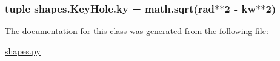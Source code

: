 \subsubsection[{ky}]{\setlength{\rightskip}{0pt plus 5cm}tuple shapes.\+Key\+Hole.\+ky = math.\+sqrt(rad$\ast$$\ast$2 -\/ {\bf kw}$\ast$$\ast$2)\hspace{0.3cm}{\ttfamily [static]}}\label{classshapes_1_1_key_hole_a544f4cb7ddd5fddf07266fe47f78f667}


The documentation for this class was generated from the following file\+:\begin{DoxyCompactItemize}
\item 
\hyperlink{shapes_8py}{shapes.\+py}\end{DoxyCompactItemize}
